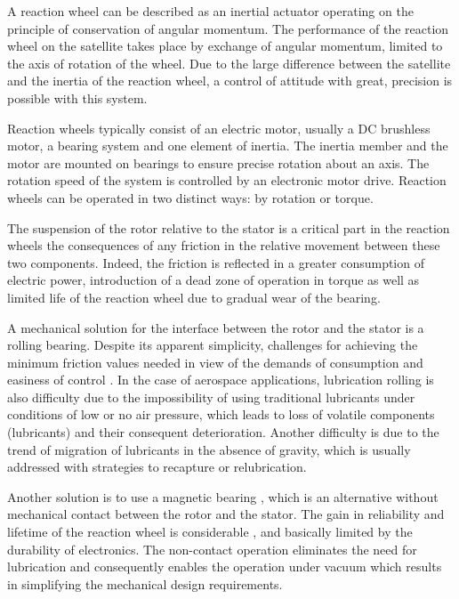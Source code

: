 \documentclass[10pt,fleqn,a4paper,twoside]{article}
\begin{document}
	A reaction wheel can be described as an inertial actuator operating on the principle of conservation of angular momentum. The performance of the reaction wheel on the satellite takes place by exchange of angular momentum, limited to the axis of rotation of the wheel. Due to the large difference between the satellite and the inertia of the reaction wheel, a control of attitude with great, precision is possible with this system.
	
	Reaction wheels typically consist of an electric motor, usually a DC brushless motor, a bearing system and one element of inertia. The inertia member and the motor are mounted on bearings to ensure precise rotation about an axis. The rotation speed of the system is controlled by an electronic motor drive. Reaction wheels can be operated in two distinct ways: by rotation or torque.
	
	The suspension of the rotor relative to the stator is a critical part in the reaction wheels \citep{taniwaki2003experimental} the consequences of any friction in the relative movement between these two components. Indeed, the friction is reflected  in a greater consumption of electric power, introduction of a dead zone of operation in torque as well as limited life of the reaction wheel due to gradual wear of the bearing.
	
	A  mechanical solution for the interface between the rotor and the stator is a rolling bearing. Despite its apparent simplicity, challenges for achieving the minimum friction values needed in view of the demands of consumption and easiness of control \citep{Krishnan2010}.
	In the case of aerospace applications, lubrication rolling is also difficulty due to the impossibility of using traditional lubricants under conditions of low or no air pressure, which leads to loss of volatile components (lubricants) and their consequent deterioration. Another difficulty is due to the trend of migration of lubricants in the absence of gravity, which is usually addressed with strategies to recapture or relubrication.
	
	Another solution is to use a magnetic bearing \citep{Bangcheng2012}, which is an alternative without mechanical contact between the rotor and the stator. The gain in reliability and lifetime of the reaction wheel is considerable \citep{Marble2006}, and basically limited by the durability of electronics. The non-contact operation eliminates the need for lubrication and consequently enables the operation under vacuum which results in simplifying the mechanical design requirements.
	
\end{document}
